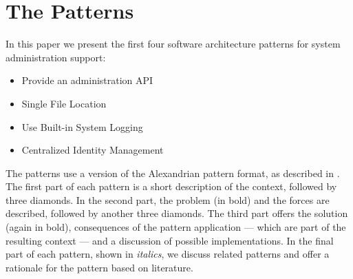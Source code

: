 \section{The Patterns}

In this paper we present the first four software architecture patterns for system administration support: 
\begin{itemize} 
	\item {\sc Provide an administration API}
	\item {\sc Single File Location}
	\item {\sc Use Built-in System Logging}
	\item {\sc Centralized Identity Management}
\end{itemize}

The patterns use a version of the Alexandrian pattern format, as described in \cite{alexander1977}. The first part of each pattern is a short description of the context, followed by three diamonds. In the second part, the problem (in bold) and the forces are described, followed by another three diamonds. The third part offers the solution (again in bold), consequences of the pattern application --- which are part of the resulting context --- and a discussion of possible implementations. In the final part of each pattern, shown in \textit{italics}, we discuss related patterns and offer a rationale for the pattern based on literature.